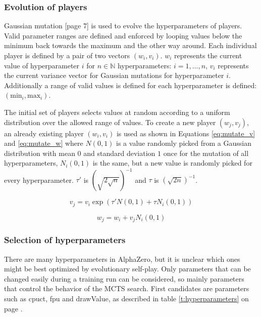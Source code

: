 \documentclass[12pt,onecolumn,oneside,titlepage]{article}
\begin{document}
\subsubsection{Evolution of players}

Gaussian mutation \cite{yao1999evolving}[page 7] is used to evolve the hyperparameters of players. Valid parameter ranges are defined and enforced by looping values below the minimum back towards the maximum and the other way around.
Each individual player is defined by a pair of two vectors $(w_i, v_i)$. $w_i$ represents the current value of hyperparameter $i$ for $n \in \mathbb{N}$ hyperparameters: $i = 1, ..., n$, $v_i$ represents the current variance vector for Gaussian mutations for hyperparameter $i$.
Additionally a range of valid values is defined for each hyperparameter is defined: $(\text{min}_i, \text{max}_i)$.

The initial set of players selects values at random according to a uniform distribution over the allowed range of values.
To create a new player $(w_j, v_j)$, an already existing player $(w_i, v_i)$ is used as shown in Equations \ref{eq:mutate_v} and \ref{eq:mutate_w} where $N(0,1)$ is a value randomly picked from a Gaussian distribution with mean $0$ and standard deviation $1$
once for the mutation of all hyperparameters,
$N_i(0,1)$ is the same, but a new value is randomly picked for every hyperparameter. $\tau'$ is $(\sqrt{2\sqrt{n}})^{-1}$ and $\tau$ is $(\sqrt{2n})^{-1}$.

\begin{equation}
 v_j = v_i \exp (\tau'N(0,1) + \tau N_i(0, 1))\label{eq:mutate_v}
\end{equation}

\begin{equation}
 w_j = w_i + v_j N_i(0, 1)\label{eq:mutate_w}
\end{equation}

\subsubsection{Selection of hyperparameters}

There are many hyperparameters in AlphaZero, but it is unclear which ones might be best optimized by evolutionary self-play. Only parameters that can be changed easily during a training run can be considered, so mainly parameters that control the behavior of the MCTS search.
First candidates are parameters such as cpuct, fpu and drawValue, as described in table \ref{t:hyperparameters} on page \pageref{t:hyperparameters}.
\end{document}
